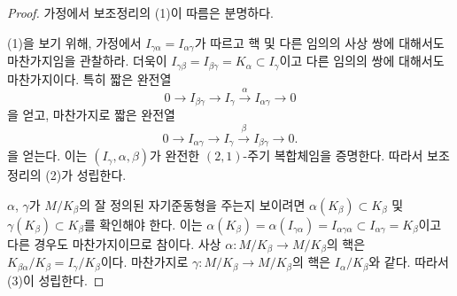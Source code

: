 \begin{proof}
가정에서 보조정리의 (1)이 따름은 분명하다.

\medskip\noindent
(1)을 보기 위해, 가정에서 $I_{\gamma\alpha} = I_{\alpha\gamma}$가
따르고 핵 및 다른 임의의 사상 쌍에 대해서도 마찬가지임을 관찰하라.
더욱이 $I_{\gamma\beta} =I_{\beta\gamma} = K_\alpha \subset I_\gamma$이고
다른 임의의 쌍에 대해서도 마찬가지이다. 특히 짧은 완전열
$$
0 \to I_{\beta\gamma} \to I_\gamma \xrightarrow{\alpha} I_{\alpha\gamma} \to 0
$$
을 얻고, 마찬가지로 짧은 완전열
$$
0 \to I_{\alpha\gamma} \to I_\gamma \xrightarrow{\beta} I_{\beta\gamma} \to 0.
$$
을 얻는다. 이는 $(I_\gamma, \alpha, \beta)$가 완전한 $(2, 1)$-주기
복합체임을 증명한다. 따라서 보조정리의 (2)가 성립한다.

\medskip\noindent
$\alpha$, $\gamma$가 $M/K_\beta$의 잘 정의된 자기준동형을 주는지
보이려면 $\alpha(K_\beta) \subset K_\beta$ 및
$\gamma(K_\beta) \subset K_\beta$를 확인해야 한다. 이는
$\alpha(K_\beta) = \alpha(I_{\gamma\alpha}) = I_{\alpha\gamma\alpha}
\subset I_{\alpha\gamma} = K_\beta$이고 다른 경우도 마찬가지이므로
참이다. 사상 $\alpha : M/K_\beta \to M/K_\beta$의 핵은
$K_{\beta\alpha}/K_\beta = I_\gamma/K_\beta$이다. 마찬가지로
$\gamma : M/K_\beta \to M/K_\beta$의 핵은 $I_\alpha/K_\beta$와 같다.
따라서 (3)이 성립한다.


\end{proof}

